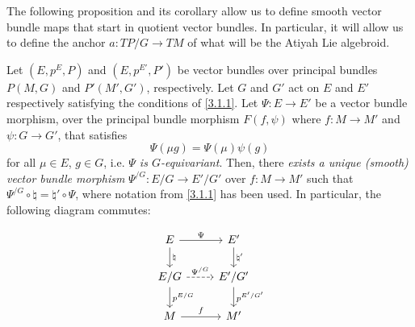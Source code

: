 The following proposition and its corollary allow us to define smooth vector bundle maps that start in quotient vector bundles. In particular, it will allow us to define the anchor $a:TP/G \to TM$ of what will be the Atiyah Lie algebroid.

\begin{proposition} \label{3.1.2}
Let $(E, p^E, P)$ and $(E, p^{E'}, P')$ be vector bundles over principal bundles $P(M, G)$ and $P'(M', G')$, respectively. Let $G$ and $G'$ act on $E$ and $E'$ respectively satisfying the conditions of \ref{3.1.1}. Let $\Psi: E \to E'$ be a vector bundle morphism, over the principal bundle morphism $F(f, \psi)$ where $f:M\to M'$ and $\psi:G \to G'$, that satisfies \[\Psi(\mu g) = \Psi(\mu) \psi(g)\] for all $\mu \in E$, $g \in G$, i.e. \emph{$\Psi$ is $G$-equivariant}. Then, there \emph{exists a unique (smooth) vector bundle morphism} $\Psi^{/G}: E/G \to E'/G'$ over $f: M \to M'$ such that $\Psi^{/G} \circ \natural = \natural' \circ \Psi$, where notation from \ref{3.1.1} has been used. In particular, the following diagram commutes:

\begin{equation} \label{diagramQuotientMorph}
\begin{tikzcd}
    E   \ar{r}{\Psi}     \ar{d}{\natural} &   E'  \ar{d}{\natural'} \\
    E/G \ar[dashed]{r}{\Psi^{/G}} \ar{d}{p^{E/G}}  & E'/G' \ar{d}{p^{E'/G'}} \\
    M \ar{r}{f} & M'
\end{tikzcd}
\end{equation}
\end{proposition}

